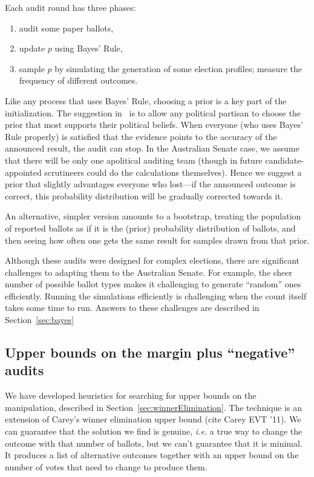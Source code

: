 \documentclass[10pt,a4paper]{article}
\begin{document}
Each audit round has three phases:
\begin{enumerate}
\item audit some paper ballots,
\item update $p$ using Bayes' Rule,
\item sample $p$ by simulating the generation of some election profiles; measure the frequency of different outcomes.
\end{enumerate}


Like any process that uses Bayes' Rule, choosing a prior is a key part of the initialization.  The suggestion in~\cite{rivest2012bayesian} is to allow any political partisan to choose the prior that most supports their political beliefs.  When everyone (who uses Bayes' Rule properly) is satisfied that the evidence points to the accuracy of the announced result, the audit can stop.  In the Australian Senate case, we assume that there will be only one apolitical auditing team (though in future candidate-appointed scrutineers could do the calculations themselves).  Hence we suggest a prior that slightly advantages everyone who lost---if the announced outcome is correct, this probability distribution will be gradually corrected towards it.

An alternative, simpler version amounts to a bootstrap, treating the population of reported ballots as
if it is the (prior) probability distribution of ballots, and then seeing how often one gets the same result for samples drawn from that prior.  

Although these audits were designed for complex elections, there are significant challenges to adapting them to the Australian Senate.  For example, the sheer number of possible ballot types makes it challenging to generate ``random'' ones efficiently.  Running the simulations efficiently is challenging when the count itself takes some time to run.  Answers to these challenges are described in Section~\ref{sec:bayes}



\subsection{Upper bounds on the margin plus ``negative'' audits}
We have developed heuristics for searching for upper bounds on the manipulation, described in Section~\ref{sec:winnerElimination}.  The technique is an extension of Carey's winner elimination upper bound (cite Carey EVT '11).  
We can guarantee that the solution we find is genuine, {\it i.e.} a true way to change the outcome with that number of ballots, but we can't guarantee that it is minimal.  It produces a list of alternative outcomes together with an upper bound on the number of votes that need to change to produce them.
\end{document}
